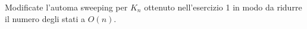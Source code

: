 \documentclass[12pt, answers]{exam}
\begin{document}
\begin{questions}
\begin{parts}
\begin{solution}
		\end{solution}
	\end{parts}
	\question Modificate l'automa sweeping per $K_n$ ottenuto nell'esercizio 1 in modo da ridurre il numero degli stati a $O(n)$.


\end{questions}
\end{document}
